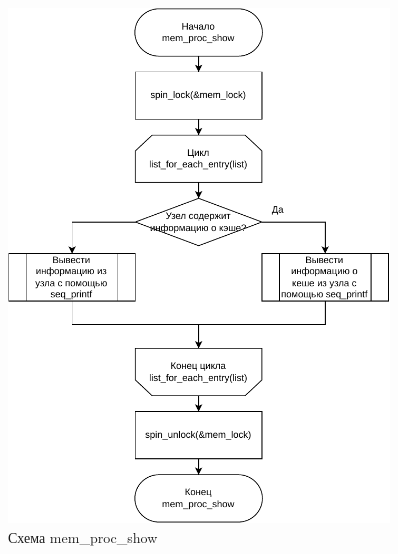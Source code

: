 \begin{figure}[H]
	\centering
	\includegraphics[width=0.9\textwidth]{diag/proc-show.pdf}
	\caption{Схема mem\_proc\_show}
	\label{fig:show}
\end{figure}


